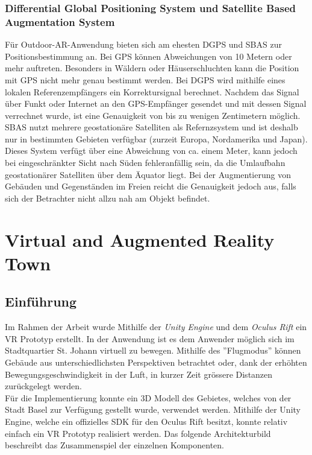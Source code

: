 \subsection*{Differential Global Positioning System und Satellite Based Augmentation System}
Für Outdoor-AR-Anwendung bieten sich am ehesten DGPS und SBAS zur Positionsbestimmung an. Bei GPS können Abweichungen von 10 Metern oder mehr auftreten. Besonders in Wäldern oder Häuserschluchten kann die Position mit GPS nicht mehr genau bestimmt werden. Bei DGPS wird mithilfe eines lokalen Referenzempfängers ein Korrektursignal berechnet. Nachdem das Signal über Funkt oder Internet an den GPS-Empfänger gesendet und mit dessen Signal verrechnet wurde, ist eine Genauigkeit von bis zu wenigen Zentimetern möglich.\\[6pt]
SBAS nutzt mehrere geostationäre Satelliten als Refernzsystem und ist deshalb nur in bestimmten Gebieten verfügbar (zurzeit Europa, Nordamerika und Japan). Dieses System verfügt über eine Abweichung von ca. einem Meter, kann jedoch bei eingeschränkter Sicht nach Süden fehleranfällig sein, da die Umlaufbahn geostationärer Satelliten über dem Äquator liegt. Bei der Augmentierung von Gebäuden und Gegenständen im Freien reicht die Genauigkeit jedoch aus, falls sich der Betrachter nicht allzu nah am Objekt befindet.\cite[S.~253~ff.]{doerner13}

\chapter{Virtual and Augmented Reality Town}\label{c.towndemo}
\vspace{-20pt}
\section{Einführung}\label{s.vrintro}
Im Rahmen der Arbeit wurde Mithilfe der \textit{Unity Engine} und dem \textit{Oculus Rift} ein VR Prototyp erstellt. In der Anwendung ist es dem Anwender möglich sich im Stadtquartier St. Johann virtuell zu bewegen. Mithilfe des ''Flugmodus'' können Gebäude aus unterschiedlichsten Perspektiven betrachtet oder, dank der erhöhten Bewegungsgeschwindigkeit in der Luft, in kurzer Zeit grössere Distanzen zurückgelegt werden.\\[6pt]
Für die Implementierung konnte ein 3D Modell des Gebietes, welches von der Stadt Basel zur Verfügung gestellt wurde, verwendet werden. Mithilfe der Unity Engine, welche ein offizielles SDK für den Oculus Rift besitzt, konnte relativ einfach ein VR Prototyp realisiert werden. Das folgende Architekturbild beschreibt das Zusammenspiel der einzelnen Komponenten.
\newpage

